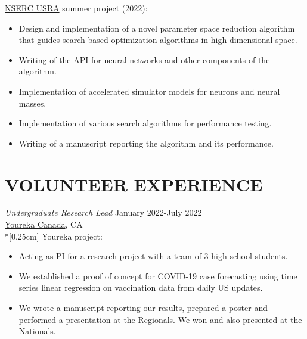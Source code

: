 \documentclass[margin, 10pt]{res} %
\begin{document}
\begin{resume}
\href{https://www.nserc-crsng.gc.ca/students-etudiants/ug-pc/usra-brpc_eng.asp}{NSERC USRA} summer project (2022):
\vspace*{0.15cm}
\begin{itemize} \itemsep -2pt %
	\item Design and implementation of a novel parameter space reduction algorithm that guides search-based optimization algorithms in high-dimensional space.
	\item Writing of the API for neural networks and other components of the algorithm.
	\item Implementation of accelerated simulator models for neurons and neural masses.
	\item Implementation of various search algorithms for performance testing.
	\item Writing of a manuscript reporting the algorithm and its performance.
\end{itemize}

\section{VOLUNTEER EXPERIENCE}

{\sl Undergraduate Research Lead} \hfill January 2022-July 2022\\ \href{https://yourekacanada.org/}{Youreka Canada}, CA\\*[0.25cm] 
Youreka project:
\vspace*{0.15cm}
\begin{itemize} \itemsep -2pt %
	\item Acting as PI for a research project with a team of 3 high school students.
	\item We established a proof of concept for COVID-19 case forecasting using time series linear regression on vaccination data from daily US updates.
	\item We wrote a manuscript reporting our results, prepared a poster and performed a presentation at the Regionals. We won and also presented at the Nationals.
\end{itemize}


\end{resume}
\end{document}
